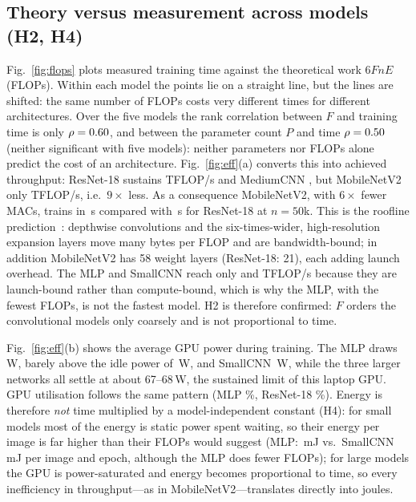 \documentclass[conference]{IEEEtran}
\begin{document}
\subsection{Theory versus measurement across models (H2, H4)}
Fig.~\ref{fig:flops} plots measured training time against the theoretical work $6FnE$ (FLOPs). Within each model the
points lie on a straight line, but the lines are shifted: the same number of FLOPs costs very different times for
different architectures. Over the five models the rank correlation between $F$ and training time is only
$\rho=0.60$, and between the parameter count $P$ and time $\rho=0.50$ (neither significant with five
models): neither parameters nor FLOPs alone predict the cost of an architecture. Fig.~\ref{fig:eff}(a) converts
this into achieved throughput: ResNet-18 sustains \tflopsRes{} TFLOP/s and MediumCNN \tflopsMedium{}, but MobileNetV2
only \tflopsMobile{} TFLOP/s, i.e.\ $9\times$ less. As a consequence MobileNetV2, with $6\times$ fewer MACs, trains
in \ttrainMobile\,s compared with \ttrainRes\,s for ResNet-18 at $n=50$k. This is the roofline
prediction~\cite{williams2009roofline}: depthwise convolutions and the six-times-wider, high-resolution expansion
layers move many bytes per FLOP and are bandwidth-bound; in addition MobileNetV2 has 58 weight layers (ResNet-18: 21),
each adding launch overhead. The MLP and SmallCNN reach only \tflopsMlp{} and \tflopsSmall{} TFLOP/s because they are
launch-bound rather than compute-bound, which is why the MLP, with the fewest FLOPs, is not the fastest model. H2 is
therefore confirmed: $F$ orders the convolutional models only coarsely and is not proportional to time.

Fig.~\ref{fig:eff}(b) shows the average GPU power during training. The MLP draws \pavgMlp\,W, barely above the idle
power of \idlepower\,W, and SmallCNN \pavgSmall\,W, while the three larger networks all settle at about 67--68\,W,
the sustained limit of this laptop GPU. GPU utilisation follows the same pattern (MLP \utilMlp\%, ResNet-18
\utilRes\%). Energy is therefore \emph{not} time multiplied by a model-independent constant (H4): for small models
most of the energy is static power spent waiting, so their energy per image is far higher than their FLOPs would
suggest (MLP: \epseMlp\,mJ vs.\ SmallCNN \epseSmall\,mJ per image and epoch, although the MLP does fewer
FLOPs); for large models the GPU is power-saturated and energy becomes proportional to time, so every inefficiency
in throughput---as in MobileNetV2---translates directly into joules.
\end{document}

